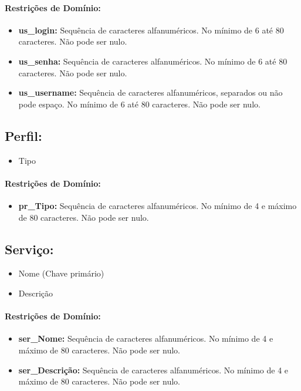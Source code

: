 \documentclass{report}
\begin{document}
\paragraph{Restrições de Domínio:}
\begin{itemize}
  \item \textbf{us\_login:} Sequência de caracteres alfanuméricos. No mínimo de 6 até 80 caracteres. Não pode ser nulo.
  \item \textbf{us\_senha:}  Sequência de caracteres alfanuméricos. No mínimo de 6 até 80 caracteres. Não pode ser nulo.
  \item \textbf{us\_username:} Sequência de caracteres alfanuméricos, separados ou não pode espaço. No mínimo de 6 até 80 caracteres. Não pode ser nulo.
\end{itemize}
\subsection{Perfil:}
\begin{itemize}
  \item Tipo
\end{itemize}
\paragraph{Restrições de Domínio:}
\begin{itemize}
  \item \textbf{pr\_Tipo:} Sequência de caracteres alfanuméricos. No mínimo de 4 e máximo de 80 caracteres. Não pode ser nulo.
\end{itemize}
\subsection{Serviço:}
\begin{itemize}
  \item Nome (Chave primário)
  \item Descrição
\end{itemize}
\paragraph{Restrições de Domínio:}
\begin{itemize}
  \item \textbf{ser\_Nome:} Sequência de caracteres alfanuméricos. No mínimo de 4 e máximo de 80 caracteres. Não pode ser nulo.
    \item \textbf{ser\_Descrição:} Sequência de caracteres alfanuméricos. No mínimo de 4 e máximo de 80 caracteres. Não pode ser nulo.
\end{itemize}
\end{document}
